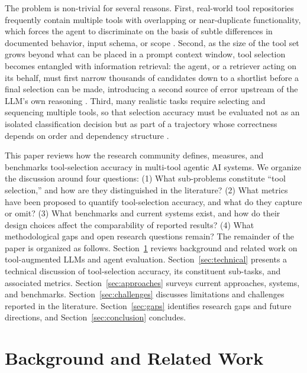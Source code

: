 \documentclass[acmsmall]{acmart}
\begin{document}
The problem is non-trivial for several reasons. First, real-world tool repositories frequently contain multiple tools with overlapping or near-duplicate functionality, which forces the agent to discriminate on the basis of subtle differences in documented behavior, input schema, or scope \citep{qin2024toolllm}. Second, as the size of the tool set grows beyond what can be placed in a prompt context window, tool selection becomes entangled with information retrieval: the agent, or a retriever acting on its behalf, must first narrow thousands of candidates down to a shortlist before a final selection can be made, introducing a second source of error upstream of the LLM's own reasoning \citep{shi2025toolretrieval}. Third, many realistic tasks require selecting and sequencing multiple tools, so that selection accuracy must be evaluated not as an isolated classification decision but as part of a trajectory whose correctness depends on order and dependency structure \citep{shen2023taskbench}.

This paper reviews how the research community defines, measures, and benchmarks tool-selection accuracy in multi-tool agentic AI systems. We organize the discussion around four questions: (1) What sub-problems constitute ``tool selection,'' and how are they distinguished in the literature? (2) What metrics have been proposed to quantify tool-selection accuracy, and what do they capture or omit? (3) What benchmarks and current systems exist, and how do their design choices affect the comparability of reported results? (4) What methodological gaps and open research questions remain? The remainder of the paper is organized as follows. Section~\ref{sec:background} reviews background and related work on tool-augmented LLMs and agent evaluation. Section~\ref{sec:technical} presents a technical discussion of tool-selection accuracy, its constituent sub-tasks, and associated metrics. Section~\ref{sec:approaches} surveys current approaches, systems, and benchmarks. Section~\ref{sec:challenges} discusses limitations and challenges reported in the literature. Section~\ref{sec:gaps} identifies research gaps and future directions, and Section~\ref{sec:conclusion} concludes.

\section{Background and Related Work}
\label{sec:background}
\end{document}
